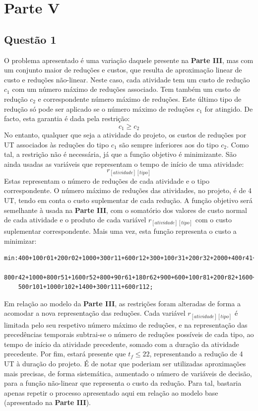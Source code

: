 \documentclass[11pt,titlepage,contentspage,a4paper]{article} %
\begin{document}
\section{Parte V}
\subsection{Questão 1}
O problema apresentado é uma variação daquele presente na \textbf{Parte III}, mas com um conjunto maior de reduções e custos, que resulta de aproximação linear de custo e reduções não-linear. Neste caso, cada atividade tem um custo de redução $c_1$ com um número máximo de reduções associado. Tem também um custo de redução $c_2$ e correspondente número máximo de reduções. Este último tipo de redução só pode ser aplicado se o número máximo de reduções $c_1$ for atingido. 
De facto, esta garantia é dada pela restrição:
$$c_1 \geq c_2$$ 
No entanto, qualquer que seja a atividade do projeto, os custos de reduções por UT associados às reduções do tipo $c_1$ são sempre inferiores aos do tipo $c_2$. Como tal, a restrição não é necessária, já que a função objetivo é minimizante. 
São ainda usadas as variáveis que representam o tempo de início de uma atividade: 
$$r_{[atividade] [tipo]}$$ 
Estas representam o número de reduções de cada atividade e o tipo correspondente. O número máximo de reduções das atividades, no projeto, é de 4 UT, tendo em conta  o custo suplementar de cada redução.
A função objetivo será semelhante à usada na \textbf{Parte III}, com o somatório dos valores de custo normal de cada atividade e o produto de cada variável $r_{[atividade] [tipo]}$ com o custo suplementar correspondente. Mais uma vez, esta função representa o custo a minimizar:
\begin{Verbatim}[frame=single]		
	min:400+100r01+200r02+1000+300r11+600r12+300+100r31+200r32+2000+400r41+
	800r42+1000+800r51+1600r52+800+90r61+180r62+900+600+100r81+200r82+1600+
	500r101+1000r102+1400+300r111+600r112;
\end{Verbatim}

Em relação ao modelo da \textbf{Parte III}, as restrições foram alteradas de forma a acomodar a nova representação das reduções. Cada variável $r_{[atividade] [tipo]}$ é limitada pelo seu respetivo número máximo de reduções, e na representação das precedências temporais subtrai-se o número de reduções possíveis de cada tipo, ao tempo de início da atividade precedente, somado com a duração da atividade precedente. Por fim, estará presente que $t_f \leqslant  22$, representando a redução de 4 UT à duração do projeto.
É de notar que poderiam ser utilizadas aproximações mais precisas, de forma sistemática, aumentado o número de variáveis de decisão, para a função não-linear que representa o custo da redução. Para tal, bastaria apenas repetir o processo apresentado aqui em relação ao modelo base (apresentado na \textbf{Parte III}).
\end{document}
